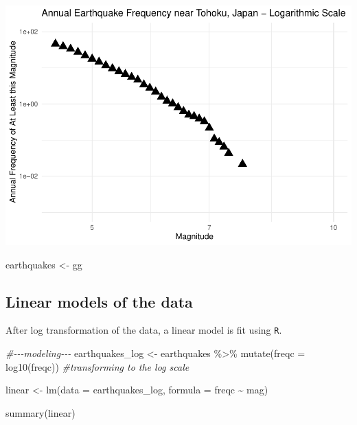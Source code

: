 \documentclass[
]{article}
\newenvironment{Shaded}{\begin{snugshade}}{\end{snugshade}}
\newcommand{\AttributeTok}[1]{\textcolor[rgb]{0.77,0.63,0.00}{#1}}
\newcommand{\CommentTok}[1]{\textcolor[rgb]{0.56,0.35,0.01}{\textit{#1}}}
\newcommand{\FunctionTok}[1]{\textcolor[rgb]{0.00,0.00,0.00}{#1}}
\newcommand{\NormalTok}[1]{#1}
\newcommand{\OtherTok}[1]{\textcolor[rgb]{0.56,0.35,0.01}{#1}}
\newcommand{\SpecialCharTok}[1]{\textcolor[rgb]{0.00,0.00,0.00}{#1}}
\begin{document}
\includegraphics{earthquakes_files/figure-latex/unnamed-chunk-4-2.pdf}

\begin{Shaded}
\begin{Highlighting}[]
\NormalTok{earthquakes }\OtherTok{\textless{}{-}}\NormalTok{ gg}
\end{Highlighting}
\end{Shaded}

\hypertarget{linear-models-of-the-data}{%
\subsection{Linear models of the data}\label{linear-models-of-the-data}}

After log transformation of the data, a linear model is fit using
\texttt{R}.

\begin{Shaded}
\begin{Highlighting}[]
\CommentTok{\#{-}{-}{-}modeling{-}{-}{-}}
\NormalTok{earthquakes\_log }\OtherTok{\textless{}{-}}\NormalTok{ earthquakes }\SpecialCharTok{\%\textgreater{}\%} \FunctionTok{mutate}\NormalTok{(}\AttributeTok{freqc =} \FunctionTok{log10}\NormalTok{(freqc)) }\CommentTok{\#transforming to the log scale}

\NormalTok{linear }\OtherTok{\textless{}{-}} \FunctionTok{lm}\NormalTok{(}\AttributeTok{data =}\NormalTok{ earthquakes\_log, }\AttributeTok{formula =}\NormalTok{ freqc }\SpecialCharTok{\textasciitilde{}}\NormalTok{ mag)}

\FunctionTok{summary}\NormalTok{(linear)}
\end{Highlighting}
\end{Shaded}
\end{document}
